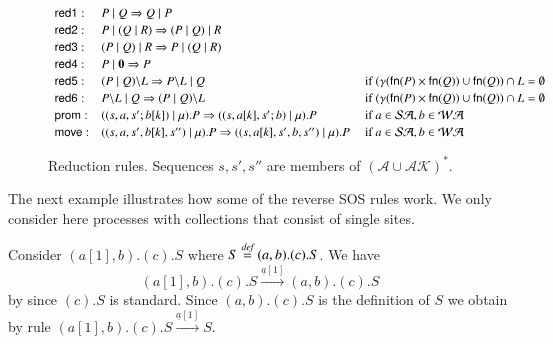 {\begin{figure}[t] 
\[
\begin{array}{lll}
\textsf{red1}: & P\mid Q \Rightarrow Q\mid P& 
\\[2pt]
\textsf{red2}: & P\mid (Q\mid R) \Rightarrow (P\mid Q)\mid R &
\\[2pt]
\textsf{red3}: & (P\mid Q)\mid R \Rightarrow P\mid (Q\mid R) & 
\\[2pt]
\textsf{red4}: & P\mid \mathbf{0} \Rightarrow P & 
\\[2pt]
\textsf{red5}: & (P\; \vert \; Q)\backslash L \Rightarrow P\backslash L \; \vert \; Q &
   \mbox{ if } (\gamma(\mathsf{fn}(P) \times \mathsf{fn}(Q)) \cup  \mathsf{fn}(Q)) \cap L = \emptyset
\\[2pt]
\textsf{red6}: & P\backslash L \; \vert \; Q \Rightarrow (P\; \vert \; Q)\backslash L & 
   \mbox{ if } (\gamma(\mathsf{fn}(P) \times \mathsf{fn}(Q)) \cup  \mathsf{fn}(Q)) \cap L = \emptyset
\\[2pt]
\textsf{prom}: & ( (s,a,s';b[k])\mid \mu).P \Rightarrow ((s,a[k],s';b)\mid \mu).P & \mbox{ if } a \in \mathcal{SA}, b \in \mathcal{WA} 
\\[2pt]
\textsf{move}: & ((s,a,s',b[k],s'')\mid \mu).P \Rightarrow ((s,a[k],s',b,s'')\mid \mu).P & \mbox{ if } a \in \mathcal{SA}, b \in \mathcal{WA}
\end{array}
\] 
\caption{Reduction rules. Sequences $s, s', s''$ are members of $(\mathcal{A} \cup \mathcal{AK})^{*}$.} 
\label{fig:reduction}
\end{figure}

The next example illustrates how some of the reverse SOS rules work. We only consider here processes with collections that consist of single sites. 
\begin{example}
{\rm 
Consider $(a[1],b).(c).S$ where $S\stackrel{\emph{def}}{=} (a,b).(c).S$. We have 
$$(a[1],b).(c).S \xrightarrow{\underline{a}[1]} (a,b).(c).S$$ by  since $(c).S$ is standard.
Since $(a,b).(c).S$ is the definition of $S$ we obtain by rule  $(a[1],b).(c).S \xrightarrow{\underline{a}[1]} S$.
}
\end{example}

}
